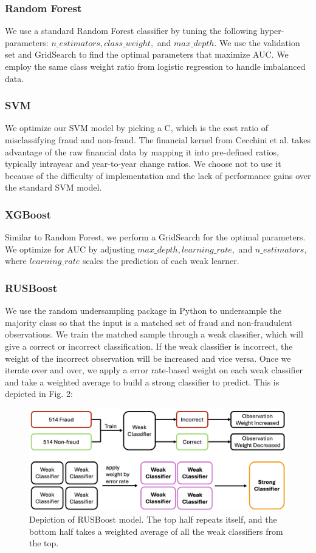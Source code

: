 \documentclass[conference]{IEEEtran}
\begin{document}
\subsubsection{Random Forest} We use a standard Random Forest classifier by tuning the following hyper-parameters: $n\_estimators, class\_weight,$ and $max\_depth$. We use the validation set and GridSearch to find the optimal parameters that maximize AUC. We employ the same class weight ratio from logistic regression to handle imbalanced data.
\subsubsection{SVM} We optimize our SVM model by picking a C, which is the cost ratio of misclassifying fraud and non-fraud. The financial kernel from Cecchini et al. \cite{b1} takes advantage of the raw financial data by mapping it into pre-defined ratios, typically intrayear and year-to-year change ratios. We choose not to use it because of the difficulty of implementation and the lack of performance gains over the standard SVM model.
\subsubsection{XGBoost} Similar to Random Forest, we perform a GridSearch for the optimal parameters. We optimize for AUC by adjusting $max\_depth, learning\_rate,$ and $n\_estimators$, where $learning\_rate$ scales the prediction of each weak learner. 
\subsubsection{RUSBoost} We use the random undersampling package in Python to undersample the majority class so that the input is a matched set of fraud and non-fraudulent observations. We train the matched sample through a weak classifier, which will give a correct or incorrect classification. If the weak classifier is incorrect, the weight of the incorrect observation will be increased and vice versa. Once we iterate over and over, we apply a error rate-based weight on each weak classifier and take a weighted average to build a strong classifier to predict. This is depicted in Fig. 2: \begin{figure}[H] \vspace{10pt}
\centerline{\includegraphics[width=\columnwidth]{rusboost}}
\caption{Depiction of RUSBoost model. The top half repeats itself, and the bottom half takes a weighted average of all the weak classifiers from the top.}
\label{fig}
\end{figure} \vspace{10pt}
\end{document}
